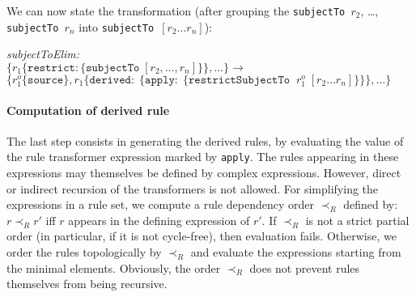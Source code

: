 We can now state the transformation (after grouping the
\texttt{subjectTo $r_2$}, \dots, \texttt{subjectTo $r_n$} into
\texttt{subjectTo $[r_2 \dots r_n]$}):


\noindent
\emph{subjectToElim:}\\
$
\{r_1 \{\mathtt{restrict}: \{\mathtt{subjectTo}\; [r_2, \dots, r_n]\}\}, \dots \} \longrightarrow$\\
$\{r_1^o \{\mathtt{source}\}, r_1 \{\mathtt{derived:}\; \{\mathtt{apply:}\; \{
\mathtt{restrictSubjectTo}\;\; r_1^o\; [r_2 \dots r_n] \}\}\}, \dots \}
$



\paragraph{\textbf{Computation of derived rule}}
The last step consists in generating the derived rules, by evaluating the
value of the rule transformer expression marked by \texttt{apply}. The rules
appearing in these expressions may themselves be defined by complex
expressions. However, direct or indirect recursion of the transformers is not allowed. For
simplifying the expressions in a rule set, we compute a rule dependency order
$\prec_R$ defined by: $r \prec_R r'$ iff $r$ appears in the defining
expression of $r'$. If $\prec_R$ is not a strict partial order (in particular, if
it is not cycle-free), then evaluation fails. Otherwise, we order the rules
topologically by $\prec_R$ and evaluate the expressions starting from the
minimal elements. Obviously, the order $\prec_R$ does not prevent rules themselves from being recursive.

